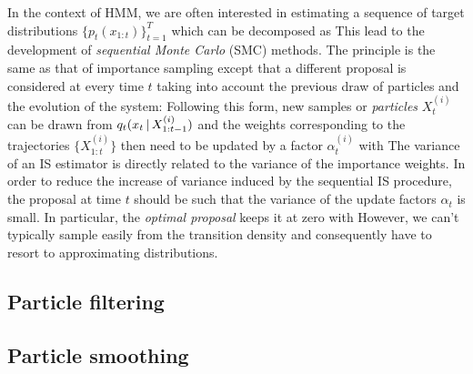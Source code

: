 In the context of HMM, we are often interested in estimating a sequence of target distributions $\{p_{t}(x_{1:t})\}_{t=1}^{T}$ which can be decomposed as 
%
%
This lead to the development of \emph{sequential Monte Carlo} (SMC) methods. The principle is the same as that of importance sampling except that a different proposal is considered at every time $t$ taking into account the previous draw of particles and the evolution of the system:
%
%
Following this form, new samples or \emph{particles} $X^{(i)}_t$ can be drawn from $q_{t}(x_{t}\,|\, X^{(i)}_{1:t-1})$ and the weights corresponding to the trajectories $\{X^{(i)}_{1:t}\}$ then need to be updated by a factor $\alpha^{(i)}_{t}$ with
%
%
The variance of an IS estimator is directly related to the variance of the importance weights. In order to reduce the increase of variance induced by the sequential IS procedure, the proposal at time $t$ should be such that the variance of the update factors $\alpha_t$ is small. In particular, the \emph{optimal proposal} keeps it at zero with
However, we can't typically sample easily from the transition density and consequently have to resort to approximating distributions. 

\subsection{Particle filtering}

\subsection{Particle smoothing}

